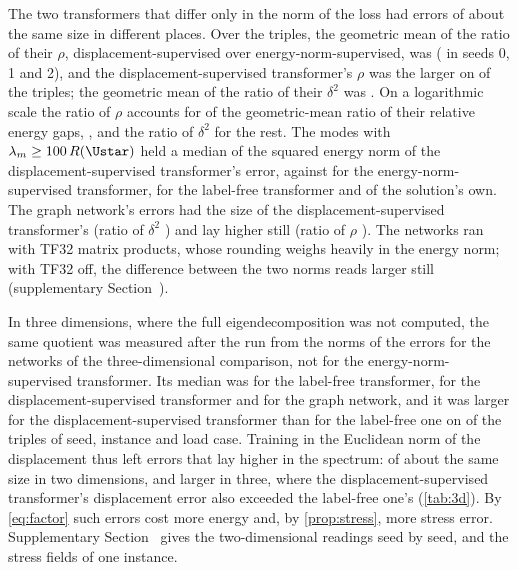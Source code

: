 The two transformers that differ only in the norm of the loss had errors of about the same
size in different places. Over the triples, the geometric mean of the ratio of their $\rho$,
displacement-supervised over energy-norm-supervised, was \numSpecLabKnormRq{}
(\numSpecLabKnormRqSeeds{} in seeds 0, 1 and 2), and the displacement-supervised
transformer's $\rho$ was the larger on \numSpecLabKnormAbove{} of the triples; the geometric
mean of the ratio of their $\delta^2$ was \numSpecLabKnormDisp{}. On a logarithmic scale the
ratio of $\rho$ accounts for \numSpecSpectralShare{} of the geometric-mean ratio of their
relative energy gaps, \numSpecLabKnormGap{}, and the ratio of $\delta^2$ for the rest. The
modes with $\lambda_m\ge 100\,R(\Ustar)$ held a median \numSpecShareKLab{} of the squared
energy norm of the displacement-supervised transformer's error, against
\numSpecShareKKnorm{} for the energy-norm-supervised transformer, \numSpecShareKFree{} for
the label-free transformer and \numSpecShareKStar{} of the solution's own. The graph
network's errors had the size of the displacement-supervised transformer's (ratio of
$\delta^2$ \numSpecMgnLabDisp{}) and lay higher still (ratio of $\rho$ \numSpecMgnLabRq{}).
The networks ran with TF32 matrix products, whose rounding weighs heavily in the energy
norm; with TF32 off, the difference between the two norms reads larger still (supplementary
Section~\SuppRepro{}).

In three dimensions, where the full eigendecomposition was not computed, the same quotient
was measured after the run from the norms of the errors for the networks of the
three-dimensional comparison, not for the energy-norm-supervised transformer. Its median was
\numFieldRqFree{} for the label-free transformer, \numFieldRqLab{} for the
displacement-supervised transformer and \numFieldRqMgn{} for the graph network, and it was
larger for the displacement-supervised transformer than for the label-free one on
\numFieldRqAboveLab{} of the \numFieldLoads{} triples of seed, instance and load case.
Training in the Euclidean norm of the displacement thus left errors that lay higher in the
spectrum: of about the same size in two dimensions, and larger in three, where the
displacement-supervised transformer's displacement error also exceeded the label-free one's
(\cref{tab:3d}). By \eqref{eq:factor} such errors cost more energy and, by
\cref{prop:stress}, more stress error. Supplementary Section~\SuppTwo{} gives the
two-dimensional readings seed by seed, and the stress fields of one instance.
